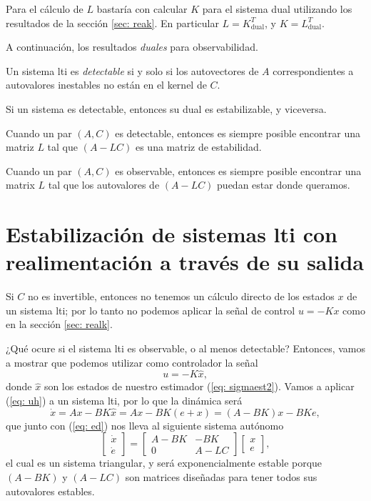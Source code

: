 Para el cálculo de $L$ bastaría con calcular $K$ para el sistema dual utilizando los resultados de la sección \ref{sec: reak}. En particular $L = K^T_{\text{dual}}$, y $K = L^T_{\text{dual}}$.

A continuación, los resultados \emph{duales} para observabilidad.
\begin{theorem}
	Un sistema lti es \emph{detectable} si y solo si los autovectores de $A$ correspondientes a autovalores inestables no están en el kernel de $C$.
\end{theorem}
Si un sistema es detectable, entonces su dual es estabilizable, y viceversa.
\begin{theorem}
	Cuando un par $(A,C)$ es detectable, entonces es siempre posible encontrar una matriz $L$ tal que $(A-LC)$ es una matriz de estabilidad.
\end{theorem}
\begin{theorem}
	Cuando un par $(A,C)$ es observable, entonces es siempre posible encontrar una matrix $L$ tal que los autovalores de $(A-LC)$ puedan estar donde queramos.
\end{theorem}

\section{Estabilización de sistemas lti con realimentación a través de su salida}

Si $C$ no es invertible, entonces no tenemos un cálculo directo de los estados $x$ de un sistema lti; por lo tanto no podemos aplicar la señal de control $u = -Kx$ como en la sección \ref{sec: realk}.

¿Qué ocure si el sistema lti es observable, o al menos detectable? Entonces, vamos a mostrar que podemos utilizar como controlador la señal
\begin{equation}
	u = -K \hat x, \label{eq: uh}
\end{equation}
donde $\hat x$ son los estados de nuestro estimador (\ref{eq: sigmaest2}). Vamos a aplicar (\ref{eq: uh}) a un sistema lti, por lo que la dinámica será
\begin{equation}
	\dot x = Ax - BK\hat x = Ax - BK(e + x) = (A -BK)x -BKe,
\end{equation}
que junto con (\ref{eq: ed}) nos lleva al siguiente sistema autónomo
\begin{equation}
	\begin{bmatrix}\dot x \\ \dot e\end{bmatrix} = \begin{bmatrix}A-BK & -BK \\ 0 & A-LC\end{bmatrix}\begin{bmatrix}x \\ e\end{bmatrix},
\end{equation}
el cual es un sistema triangular, y será exponencialmente estable porque $(A-BK)$ y $(A-LC)$ son matrices diseñadas para tener todos sus autovalores estables.

